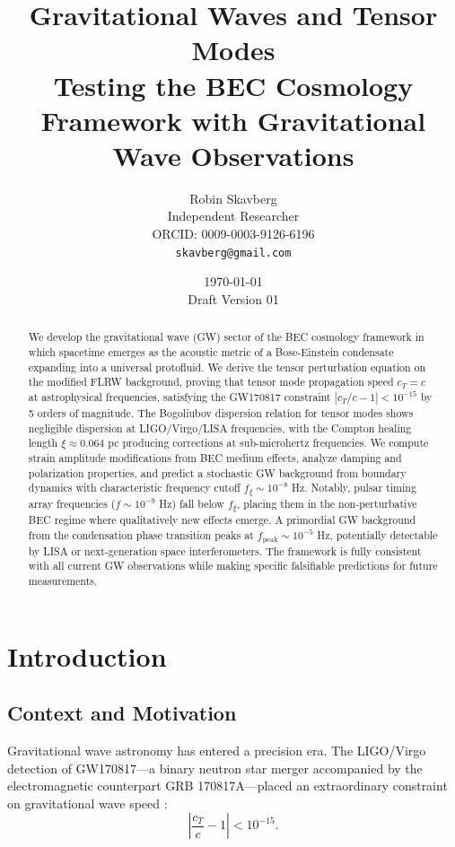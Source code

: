 \documentclass[11pt,a4paper]{article}
\title{\textbf{Gravitational Waves and Tensor Modes}\\[0.5em]
\large Testing the BEC Cosmology Framework with Gravitational Wave Observations}
\author{Robin Skavberg\\[0.3em]
\small Independent Researcher\\
\small ORCID: 0009-0003-9126-6196\\
\small \texttt{skavberg@gmail.com}}
\date{\today\\[0.5em]
\small Draft Version 01}
\newcommand{\cT}{\ensuremath{c_T}}
\theoremstyle{definition}
\theoremstyle{remark}
\begin{document}
\maketitle

\begin{abstract}
We develop the gravitational wave (GW) sector of the BEC cosmology framework in which spacetime emerges as the acoustic metric of a Bose-Einstein condensate expanding into a universal protofluid. We derive the tensor perturbation equation on the modified FLRW background, proving that tensor mode propagation speed $\cT = c$ at astrophysical frequencies, satisfying the GW170817 constraint $|\cT/c - 1| < 10^{-15}$ by 5 orders of magnitude. The Bogoliubov dispersion relation for tensor modes shows negligible dispersion at LIGO/Virgo/LISA frequencies, with the Compton healing length $\xi \approx 0.064$ pc producing corrections at sub-microhertz frequencies. We compute strain amplitude modifications from BEC medium effects, analyze damping and polarization properties, and predict a stochastic GW background from boundary dynamics with characteristic frequency cutoff $f_\xi \sim 10^{-8}$ Hz. Notably, pulsar timing array frequencies ($f \sim 10^{-9}$ Hz) fall below $f_\xi$, placing them in the non-perturbative BEC regime where qualitatively new effects emerge. A primordial GW background from the condensation phase transition peaks at $f_{\mathrm{peak}} \sim 10^{-5}$ Hz, potentially detectable by LISA or next-generation space interferometers. The framework is fully consistent with all current GW observations while making specific falsifiable predictions for future measurements.
\end{abstract}

\tableofcontents
\newpage

\section{Introduction}
\label{sec:introduction}

\subsection{Context and Motivation}
\label{sec:context}

Gravitational wave astronomy has entered a precision era. The LIGO/Virgo detection of GW170817---a binary neutron star merger accompanied by the electromagnetic counterpart GRB 170817A---placed an extraordinary constraint on gravitational wave speed \cite{Abbott2017,Abbott2017GRB}:
\begin{equation}
\label{eq:gw170817_constraint}
\left|\frac{\cT}{c} - 1\right| < 10^{-15}.
\end{equation}
\end{document}

